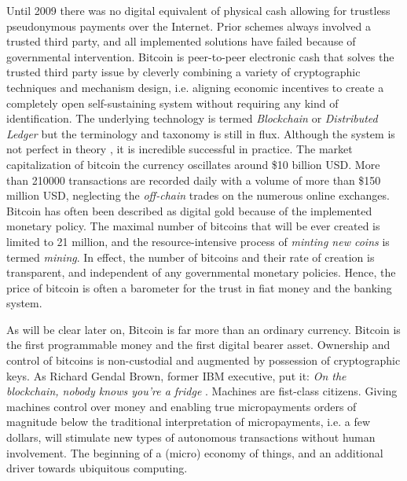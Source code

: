 Until 2009 there was no digital equivalent of physical cash allowing for trustless pseudonymous payments over the Internet. Prior schemes always involved a trusted third party, and all implemented solutions have failed because of governmental intervention. Bitcoin is peer-to-peer electronic cash \parencite{nakamoto2008bitcoin} that solves the trusted third party issue by cleverly combining a variety of cryptographic techniques and mechanism design, i.e. aligning economic incentives to create a completely open self-sustaining system without requiring any kind of identification. The underlying technology is termed \emph{Blockchain} or \emph{Distributed Ledger} but the terminology and taxonomy is still in flux. Although the system is not perfect in theory \parencite{Eyal2014}, it is incredible successful in practice. The market capitalization of bitcoin the currency oscillates around \$10 billion USD. More than 210000 transactions are recorded daily with a volume of more than \$150 million USD, neglecting the \emph{off-chain} trades on the numerous online exchanges. Bitcoin has often been described as digital gold because of the implemented monetary policy. The maximal number of bitcoins that will be ever created is limited to 21 million, and the resource-intensive process of \emph{minting new coins} is termed \emph{mining}. In effect, the number of bitcoins and their rate of creation is transparent, and independent of any governmental monetary policies. Hence, the price of bitcoin is often a barometer for the trust in fiat money and the banking system.

As will be clear later on, Bitcoin is far more than an ordinary currency. Bitcoin is the first programmable money and the first digital bearer asset. Ownership and control of bitcoins is non-custodial and augmented by possession of cryptographic keys. As Richard Gendal Brown, former IBM executive, put it: \emph{On the blockchain, nobody knows you're a fridge} \parencite{brown2013}. Machines are fist-class citizens. Giving machines control over money and enabling true micropayments orders of magnitude below the traditional interpretation of micropayments, i.e. a few dollars, will stimulate new types of autonomous transactions without human involvement. The beginning of a (micro) economy of things, and an additional driver towards ubiquitous computing.

